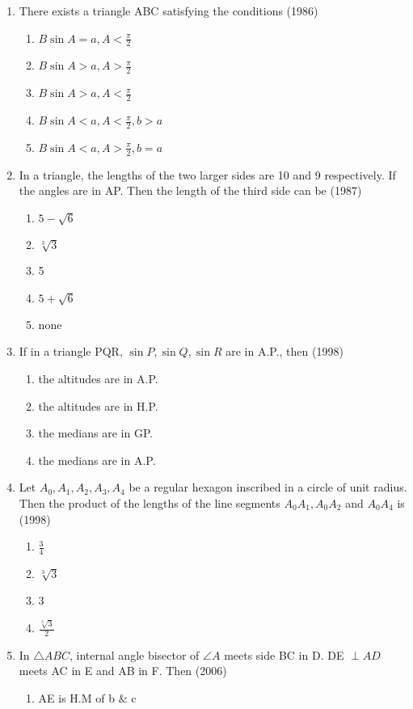 \documentclass[12pt]{article}
\begin{document}
\begin{enumerate}
\item  There exists a triangle ABC satisfying the conditions (1986)
\begin{enumerate}
\item $B \sin A=a,A<\frac{\pi}{2}$
\item $B \sin A>a,A>\frac{\pi}{2}$
\item $B \sin A>a,A<\frac{\pi}{2}$
\item $B \sin A<a,A<\frac{\pi}{2},b>a$
\item $B \sin A<a,A>\frac{\pi}{2},b=a$
\end{enumerate}
\item In a triangle, the lengths of the two larger sides are 10 and 9 respectively. If the angles are in AP. Then the length of the third side can be (1987)
\begin{enumerate}
\item $5-\sqrt{6}$
\item $\sqrt[3]{3}$
\item 5
\item $5+\sqrt{6}$
\item none
\end{enumerate}
\item If in a triangle PQR, $\sin P,\sin Q,\sin R$ are in A.P., then (1998)
\begin{enumerate}
\item  the altitudes are in A.P. 
\item the altitudes are in H.P.
\item the medians are in GP. 
\item the medians are in A.P.
\end{enumerate}
\item Let $A_0,A_1,A_2,A_3,A_4$ be a regular hexagon inscribed in a circle of unit radius. Then the product of the lengths of the line segments $A_0A_1,A_0A_2$ and $A_0A_4$ is (1998)
\begin{enumerate}
\item $\frac{3}{4}$
\item $\sqrt[3]{3}$
\item 3 
\item $\frac{\sqrt[3]{3}}{2}$
\end{enumerate}
\item In $\triangle ABC$, internal angle bisector of $\angle A$ meets side BC in D.
DE $\perp AD$ meets AC in E and AB in F. Then (2006)
\begin{enumerate}
\item AE is H.M of b $\&$ c

\end{enumerate}
\end{enumerate}
\end{document}
